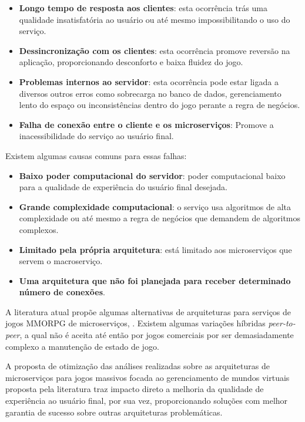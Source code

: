 \begin{itemize}
  \item \textbf{Longo tempo de resposta aos clientes}: esta ocorrência trás uma qualidade insatisfatória ao usuário ou até mesmo impossibilitando o uso do serviço.
  \item \textbf{Dessincronização com os clientes}: esta ocorrência promove reversão na aplicação, proporcionando desconforto e baixa fluidez do jogo.
  \item \textbf{Problemas internos ao servidor}: esta ocorrência pode estar ligada a diversos outros erros como sobrecarga no banco de dados, gerenciamento lento do espaço ou inconsistências dentro do jogo perante a regra de negócios.
  \item \textbf{Falha de conexão entre o cliente e os microserviços}: Promove a inacessibilidade do serviço ao usuário final.
\end{itemize}

Existem algumas causas comuns para essas falhas:

\begin{itemize}
  \item \textbf{Baixo poder computacional do servidor}: poder computacional baixo para a qualidade de experiência do usuário final desejada.
  \item \textbf{Grande complexidade computacional}: o serviço usa algoritmos de alta complexidade ou até mesmo a regra de negócios que demandem de algoritmos complexos.
  \item \textbf{Limitado pela própria arquitetura}: está limitado aos microserviços que servem o macroserviço.
  \item \textbf{Uma arquitetura que não foi planejada para receber determinado número de conexões}.
\end{itemize}

A literatura atual propõe algumas alternativas de arquiteturas para serviços de jogos MMORPG de microserviços, \cite{stephenclarkewillson2017} \cite{albion_online_unite}. Existem algumas variações híbridas \textit{peer-to-peer}, a qual não é aceita até então por jogos comerciais por ser demasiadamente complexo a manutenção de estado de jogo.

A proposta de otimização das análises realizadas sobre as arquiteturas de microserviços para jogos massivos focada ao gerenciamento de mundos virtuais proposta pela literatura traz impacto direto a melhoria da qualidade de experiência ao usuário final, por sua vez, proporcionando soluções com melhor garantia de sucesso sobre outras arquiteturas problemáticas.
